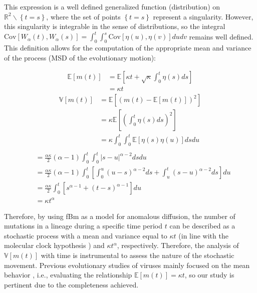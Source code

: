 This expression is a well defined generalized function (distribution) on $\mathbb{R}^2 \backslash \left\{t=s\right\}$, where the set of points $\left\{t=s\right\}$ represent a singularity. However, this singularity is integrable in the sense of distributions, so the integral $\text{Cov}\left[W_\alpha(t),W_\alpha(s)\right] = \int_0^t\int_0^s\text{Cov}\left[\eta(u),\eta(v)\right]dudv$ remains well defined. This definition allows for the computation of the appropriate mean and variance of the process (MSD of the evolutionary motion):

\begin{align}
    \mathbb{E}\left[m(t)\right] &= \mathbb{E}\left[\kappa t + \sqrt{\kappa}\int_0^t \eta(s)ds\right]\\
    &= \kappa t
\end{align}
\begin{align}
    \mathbb{V}\left[m(t)\right] &= \mathbb{E}\left[\left(m(t) - \mathbb{E}\left[m(t)\right]\right)^2\right]\\
    &= \kappa\mathbb{E}\left[\left(\int_0^t \eta(s)ds\right)^2\right]\nonumber\\
    &= \kappa\int_0^t\int_0^t\mathbb{E}\left[\eta(s)\eta(u)\right]dsdu\nonumber\\
\end{align}
\begin{align}
    &= \frac{\alpha\kappa}{2}(\alpha - 1)\int_0^t\int_0^t\left|s - u\right|^{\alpha - 2}dsdu\nonumber\\
    &= \frac{\alpha\kappa}{2}(\alpha - 1)\int_0^t\left[\int_0^u\left(u - s\right)^{\alpha - 2}ds + \int_u^t\left(s - u\right)^{\alpha - 2}ds\right]du\nonumber\\
    &= \frac{\alpha\kappa}{2}\int_0^t\left[s^{\alpha-1}+(t-s)^{\alpha - 1}\right]du\nonumber\\
    &= \kappa t^\alpha\label{eq:fbm-variance}
\end{align}

Therefore, by using fBm as a model for anomalous diffusion, the number of mutations in a lineage during a specific time period $t$ can be described as a stochastic process with a mean and variance equal to $\kappa t$ (in line with the molecular clock hypothesis \cite{ayala1999}) and $\kappa t^\alpha$, respectively. Therefore, the analysis of $\mathbb{V}\left[m(t)\right]$ with time is instrumental to assess the nature of the stochastic movement. Previous evolutionary studies of viruses mainly focused on the mean behavior \cite{jenkins2002,ghafari2022,neher2022,tay2022,wang2022}, i.e., evaluating the relationship $\mathbb{E}\left[m(t)\right]=\kappa t$, so our study is pertinent due to the completeness achieved.

